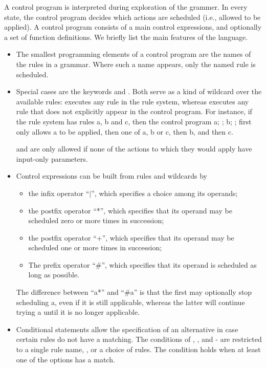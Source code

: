 A control program is interpreted during exploration of the grammer. In every
state, the control program decides which actions are scheduled (i.e., allowed
to be applied). A control program consists of a main control expressions, and
optionally a set of function definitions. We briefly list the main features of
the language.
%
\begin{itemize}
\item The smallest programming elements of a control program are the names of
  the rules in a grammar. Where such a name appears, only the named rule is scheduled.

\item Special cases are the keywords \anyK{} and \otherK. Both
  serve as a kind of wildcard over the available rules: \anyK{} executes
  any rule in the rule system, whereas \otherK{} executes any rule that
  does not explicitly appear in the control program. For instance, if the rule
  system has rules \textsf{a}, \textsf{b} and \textsf{c}, then the control
  program \textsf{a; \anyK; b; \otherK;} first only allows
  \textsf{a} to be applied, then one of \textsf{a}, \textsf{b} or \textsf{c},
  then \textsf{b}, and then \textsf{c}.

  \anyK and \otherK are only allowed if none of the actions to which they
  would apply have input-only parameters.

\item Control expressions can be built from rules and wildcards by 
\begin{itemize}\noitemsep
\item the infix operator ``\textsf{$|$}'', which specifies a choice among its
  operands;
\item the postfix operator ``\textsf{*}'', which specifies that its operand may
  be scheduled zero or more times in succession;
\item the postfix operator ``\textsf{+}'', which specifies that its operand may
  be scheduled one or more times in succession;
\item The prefix operator ``\textsf{\#}'', which specifies that its operand is
  scheduled as long as possible. 
\end{itemize}
The difference between ``\textsf{a*}'' and ``\textsf{\#a}'' is that the first
may optionally stop scheduling \textsf{a}, even if it is still applicable,
whereas the latter will continue trying \textsf{a} until it is no longer applicable.

\item Conditional statements allow the specification of an alternative in case
  certain rules do not have a matching. The conditions of \ifK,
  \whileK, \untilK{} and \doK-\whileK{} are restricted to a
  single rule name, \trueK, or a choice of rules. The condition holds
  when at least one of the options has a match.


\end{itemize}
